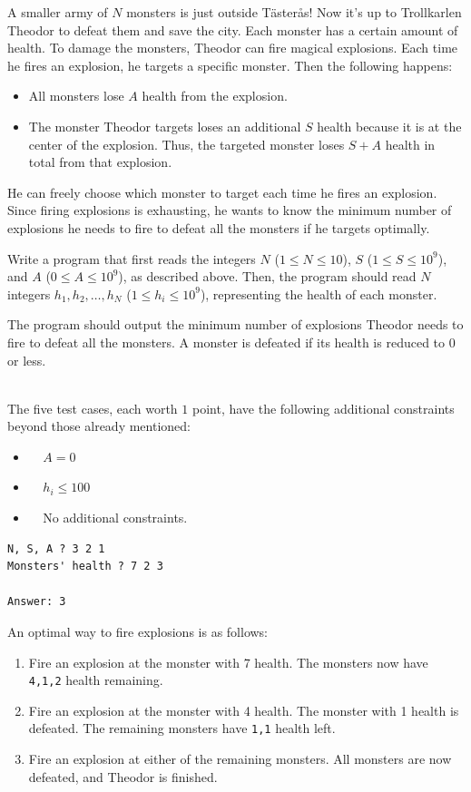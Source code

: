 \newpage
{}

A smaller army of $N$ monsters is just outside Tästerås! 
Now it's up to Trollkarlen Theodor to defeat them and save the city. 
Each monster has a certain amount of health. To damage the monsters, 
Theodor can fire magical explosions. Each time he fires an explosion, 
he targets a specific monster. Then the following happens:  
\begin{itemize}
  \item All monsters lose $A$ health from the explosion.
  \item The monster Theodor targets loses an additional $S$ health because it is at the center of the explosion. Thus, the targeted monster loses $S+A$ health in total from that explosion.
\end{itemize}
He can freely choose which monster to target each time he fires an explosion.  
Since firing explosions is exhausting, he wants to know the minimum number of explosions he needs to fire to defeat all the monsters if he targets optimally.  

Write a program that first reads the integers $N$ ($1 \leq N \leq 10$), $S$ ($1 \leq S \leq 10^9$), and $A$ ($0 \leq A \leq 10^9$), as described above. 
Then, the program should read $N$ integers $h_1, h_2, \ldots, h_N$ ($1 \leq h_i \leq 10^9$), representing the health of each monster.  

The program should output the minimum number of explosions Theodor needs to fire to defeat all the monsters. A monster is defeated if its health is reduced to $0$ or less.  

\\  
The five test cases, each worth $1$ point, have the following additional constraints beyond those already mentioned:

\begin{itemize}
    \item[(1)] $\;\;\;\; A=0$
    \item[(2-3)] $\;\;\;\; h_i \leq 100$
    \item[(4-5)] $\;\;\;\; $No additional constraints.
\end{itemize}


\begin{verbatim}
N, S, A ? 3 2 1
Monsters' health ? 7 2 3

Answer: 3
\end{verbatim}
 An optimal way to fire explosions is as follows:
\begin{enumerate}
  \item Fire an explosion at the monster with 7 health. The monsters now have \verb+4,1,2+ health remaining.
  \item Fire an explosion at the monster with 4 health. The monster with 1 health is defeated. The remaining monsters have \verb+1,1+ health left.
  \item Fire an explosion at either of the remaining monsters. All monsters are now defeated, and Theodor is finished.
\end{enumerate}

